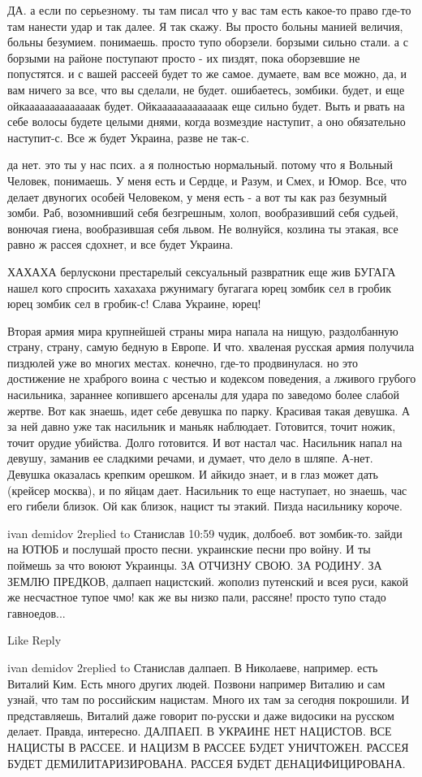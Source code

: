 ДА. а если по серьезному. ты там писал что у вас там есть какое-то право где-то
там нанести удар и так далее. Я так скажу. Вы просто больны манией величия,
больны безумием. понимаешь. просто тупо оборзели. борзыми сильно стали. а с
борзыми на районе поступают просто - их пиздят, пока оборзевшие не попустятся.
и с вашей рассеей будет то же самое. думаете, вам все можно, да, и вам ничего
за все, что вы сделали, не будет. ошибаетесь, зомбики. будет, и еще
ойкаааааааааааааак будет. Ойкааааааааааааак еще сильно будет. Выть и рвать на
себе волосы будете целыми днями, когда возмездие наступит, а оно обязательно
наступит-с. Все ж будет Украина, разве не так-с.

да нет. это ты у нас псих. а я полностью нормальный. потому что я Вольный
Человек, понимаешь. У меня есть и Сердце, и Разум, и Смех, и Юмор. Все, что
делает двуногих особей Человеком, у меня есть - а вот ты как раз безумный
зомби. Раб, возомнивший себя безгрешным, холоп, вообразивший себя судьей,
вонючая гиена, вообразившая себя львом. Не волнуйся, козлина ты этакая, все
равно ж рассея сдохнет, и все будет Украина.

ХАХАХА берлускони престарелый сексуальный развратник еще жив БУГАГА нашел кого
спросить хахахаха ржунимагу бугагага юрец зомбик сел в гробик юрец зомбик сел в
гробик-с! Слава Украине, юрец!

Вторая армия мира крупнейшей страны мира напала на нищую, раздолбанную страну,
страну, самую бедную в Европе. И что. хваленая русская армия получила пиздюлей
уже во многих местах. конечно, где-то продвинулася. но это достижение не
храброго воина с честью и кодексом поведения, а лживого грубого насильника,
зараннее копившего арсеналы для удара по заведомо более слабой жертве. Вот как
знаешь, идет себе девушка по парку. Красивая такая девушка. А за ней давно уже
так насильник и маньяк наблюдает. Готовится, точит ножик, точит орудие
убийства. Долго готовится. И вот настал час. Насильник напал на девушу, заманив
ее сладкими речами, и думает, что дело в шляпе. А-нет. Девушка оказалась
крепким орешком. И айкидо знает, и в глаз может дать (крейсер москва), и по
яйцам дает. Насильник то еще наступает, но знаешь, час его гибели близок. Ой
как близок, нацист ты этакий. Пизда насильнику короче.

ivan demidov 2replied to Станислав 10:59 чудик, долбоеб. вот зомбик-то. зайди
на ЮТЮБ и послушай просто песни. украинские песни про войну. И ты поймешь за
что воюют Украинцы. ЗА ОТЧИЗНУ СВОЮ. ЗА РОДИНУ. ЗА ЗЕМЛЮ ПРЕДКОВ, далпаеп
нацистский. жополиз путенский и всея руси, какой же несчастное тупое чмо! как
же вы низко пали, рассяне! просто тупо стадо гавноедов...

		Like Reply

ivan demidov 2replied to Станислав далпаеп. В Николаеве, например. есть Виталий
Ким. Есть много других людей. Позвони например Виталию и сам узнай, что там по
российским нацистам. Много их там за сегодня покрошили. И представляешь,
Виталий даже говорит по-русски и даже видосики на русском делает. Правда,
интересно. ДАЛПАЕП. В УКРАИНЕ НЕТ НАЦИСТОВ. ВСЕ НАЦИСТЫ В РАССЕЕ. И НАЦИЗМ В
РАССЕЕ БУДЕТ УНИЧТОЖЕН. РАССЕЯ БУДЕТ ДЕМИЛИТАРИЗИРОВАНА. РАССЕЯ БУДЕТ
ДЕНАЦИФИЦИРОВАНА.
